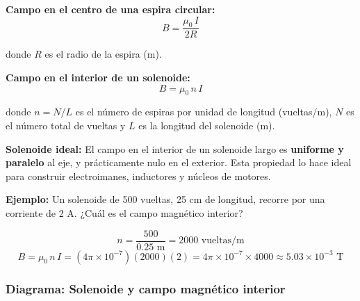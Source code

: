\begin{seccion}
\begin{ecuacion}
\textbf{Campo en el centro de una espira circular:}
$$B = \frac{\mu_0 \, I}{2 R}$$

donde $R$ es el radio de la espira (m).

\vspace{0.3cm}

\textbf{Campo en el interior de un solenoide:}
$$B = \mu_0 \, n \, I$$

donde $n = N/L$ es el número de espiras por unidad de longitud (vueltas/m), $N$ es el número total de vueltas y $L$ es la longitud del solenoide (m).
\end{ecuacion}

\begin{nota}
\textbf{Solenoide ideal:} El campo en el interior de un solenoide largo es \textbf{uniforme y paralelo} al eje, y prácticamente nulo en el exterior. Esta propiedad lo hace ideal para construir electroimanes, inductores y núcleos de motores.
\end{nota}

\textbf{Ejemplo:} Un solenoide de 500 vueltas, 25 cm de longitud, recorre por una corriente de 2 A. ¿Cuál es el campo magnético interior?

$$n = \frac{500}{0.25 \text{ m}} = 2000 \text{ vueltas/m}$$
$$B = \mu_0 \, n \, I = (4\pi \times 10^{-7})(2000)(2) = 4\pi \times 10^{-7} \times 4000 \approx 5.03 \times 10^{-3} \text{ T}$$
\end{seccion}

\subsubsection{Diagrama: Solenoide y campo magnético interior}

\begin{center}


\end{center}


